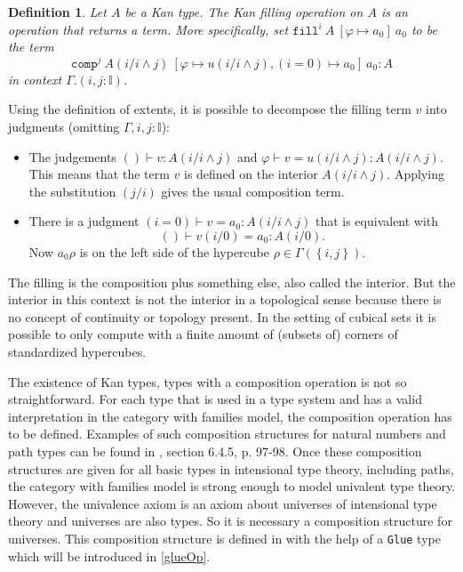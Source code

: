 \documentclass[12pt,a4paper,twoside,xetex]{book} %
\newcommand{\keyword}[1]{\emph{#1}\index{#1}}
\newtheorem{definition}[theorem]{Definition}
\newcommand{\op}[1]{\mathtt{#1}}
\newcommand{\fillt}[5]{\op{fill}^{#1} \ {#2} \ \left[{#3} \mapsto {#5} \right] \ {#5}}
\begin{document}
\begin{definition}\label{filldef}
Let $A$ be a Kan type. The Kan \keyword{filling} operation on $A$ is an 
operation that returns a term. More specifically, set 
$\fillt{i}{A}{\varphi}{u}{a_0}$ to be the term $$\op{comp}^j \ A(i/i \wedge j) 
\ \left[\varphi \mapsto u(i/i \wedge j), (i=0) \mapsto a_0 \right] \ a_0 : A $$ 
in context $\Gamma . (i, j: \mathbb{I})$.
\end{definition}

Using the definition of extents, it is possible to decompose the filling term 
$v$ into judgments (omitting $\Gamma, i,j : \mathbb{I}$):

\begin{itemize}

\item The judgements $()\vdash v : A(i/i \wedge j)$ and $\varphi \vdash v = 
u(i/i \wedge j) : A(i/i \wedge j)$. 
This means that the term $v$ is defined on the interior $A(i/i \wedge j)$. 
Applying the substitution $(j/i)$ gives the usual composition term.

\item There is a judgment $(i = 0) \vdash v = a_0 : A(i/i \wedge j)$ that is 
equivalent with $$() \vdash v(i/0) = a_0 : A(i/0).$$
Now $a_0\rho$ is on the left side of the hypercube $\rho \in \Gamma \left( 
\left\{i,j\right\} \right)$.

\end{itemize}

The filling is the composition plus something else, also called the interior. 
But the interior in this context is not the interior in a topological sense 
because there is no concept of continuity or topology present. In the setting of cubical sets it is 
possible to only compute with a finite amount of (subsets of) corners of 
standardized hypercubes.

The existence of Kan types, types with a composition operation is not so 
straightforward. For each type that is used in a type system and has a valid 
interpretation in the category with families model, the composition operation 
has to be defined. Examples of such composition structures for natural numbers 
and path types can be found in \cite{Huber2016}, section 6.4.5, p. 97-98. Once 
these composition structures are given for all basic types in intensional type 
theory, including paths, the category with families model is strong enough to 
model univalent type theory. However, the univalence axiom is an axiom about 
universes of intensional type theory and universes are also types. So it is 
necessary a composition structure for universes. This composition structure is 
defined in \cite{Huber2016} with the help of a \texttt{Glue} type which will be 
introduced in \cref{glueOp}. 
\end{document}
